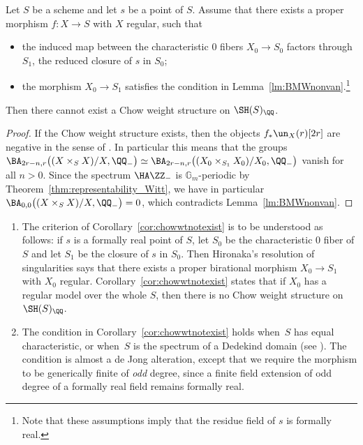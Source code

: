 \begin{num}
\begin{cor}
\label{cor:chowwtnotexist}
Let $S$ be a scheme and let $s$ be a point of $S$. Assume that there exists a proper morphism $f:X\to S$ with $X$ regular, such that
\begin{itemize}
\item the induced map between the characteristic $0$ fibers $X_0\to S_0$ factors through $S_1$, the reduced closure of $s$ in $S_0$;
\item the morphism $X_0\to S_1$ satisfies the condition in Lemma~\ref{lm:BMWnonvan}.\footnote{Note that these assumptions imply that the residue field of $s$ is formally real.}
\end{itemize}
Then there cannot exist a Chow weight structure on $\SH(S)_{\QQ}$.
\end{cor}
\begin{proof}
If the Chow weight structure exists, then the objects $f_*\un_X(r)[2r]$ are negative in the sense of \cite[Def.\,1.5\,VII]{Bondarkorweight}. In particular this means that the groups $\BA_{2r-n,r}\big((X\times_{S}X)/X,\QQ_-\big)\simeq\BA_{2r-n,r}\big((X_0\times_{S_1}X_0)/X_0,\QQ_-\big)$ vanish for all $n>0$. Since the spectrum $\HA \ZZ_-$ is $\mathbb{G}_m$-periodic by Theorem~\ref{thm:representability_Witt}, we have in particular $\BA_{0,0}\big((X\times_{S}X)/X,\QQ_-\big)=0$, which contradicts Lemma~\ref{lm:BMWnonvan}.
\end{proof}

\skpt
\begin{rem}
\begin{enumerate}
\item
The criterion of Corollary~\ref{cor:chowwtnotexist} is to be understood as follows: if $s$ is a formally real point of $S$, let $S_0$ be the characteristic $0$ fiber of $S$ and let $S_1$ be the closure of $s$ in $S_0$. Then Hironaka's resolution of singularities says that there exists a proper birational morphism $X_0\to S_1$ with $X_0$ regular. Corollary~\ref{cor:chowwtnotexist} states that if $X_0$ has a regular model over the whole $S$, then there is no Chow weight structure on $\SH(S)_{\QQ}$.

\item
The condition in Corollary~\ref{cor:chowwtnotexist} holds when~$S$ has equal characteristic, or when~$S$ is the spectrum of a Dedekind domain (see \cite[1.2.2]{Scholl}). The condition is almost a de Jong alteration, except that we require the morphism to be generically finite of \emph{odd} degree, since a finite field extension of odd degree of a formally real field remains formally real.
\end{enumerate}
\end{rem}

\end{num}


